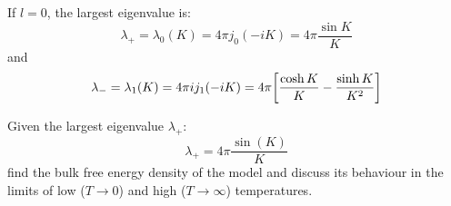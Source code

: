 \documentclass[../main/main.tex]{subfiles}
\begin{document}
If \( l=0 \), the largest eigenvalue is:
\begin{equation}
  \lambda _+ = \lambda _0 (K) = 4 \pi j_0 (-iK) = 4 \pi \frac{\sin K }{K}
\end{equation}
and
\begin{equation}
  \lambda _- = \lambda _1 (K) = 4 \pi i j_1 (-iK) = 4 \pi \qty[\frac{\cosh K }{K}-\frac{\sinh K }{K^2}]
\end{equation}

\begin{exercise}
Given the largest eigenvalue \( \lambda _+ \):
\begin{equation}
  \lambda _+ = 4 \pi \frac{\sin(K) }{K}
\end{equation}
find the bulk free energy density of the model and discuss its behaviour in the limits of low (\( T \rightarrow 0 \)) and high (\( T \rightarrow \infty  \)) temperatures.
\end{exercise}
\end{document}
